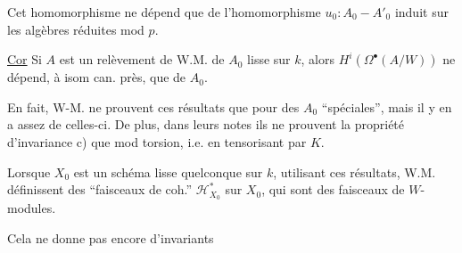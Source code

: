 
Cet homomorphisme ne dépend que de l'homomorphisme $u_0:A_0-A'_0$ induit sur les algèbres réduites mod $p$.

\uline{Cor} Si $A$ est un relèvement de W.M.  de $A_0$ lisse sur $k$, alors $H^i(\Omega^\bullet(A/W))$ ne dépend, à isom can. près, que de $A_0$.

En fait, W-M. ne prouvent ces résultats que pour des $A_0$ ``spéciales'', mais il y en a assez de celles-ci. De plus, dans leurs notes ils ne prouvent la propriété d'invariance c) que mod torsion, i.e. en tensorisant par $K$.

 Lorsque $X_0$ est un schéma lisse quelconque sur $k$, utilisant ces résultats, W.M. définissent  des ``faisceaux de coh.''  $\mathcal H^*_{X_0}$ sur $X_0$, qui sont des faisceaux de $W$-modules.

Cela ne donne pas encore d'invariants

